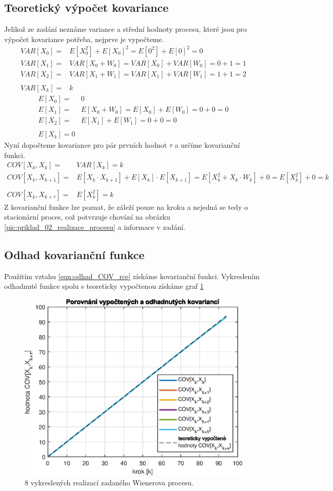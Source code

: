 \documentclass{article}
\begin{document}
		\subsection{Teoretický výpočet kovariance}
			Jelikož ze zadání neznáme variance a střední hodnoty procesu, které jsou pro výpočet kovariance potřeba, nejprve je vypočteme.
			\begin{align}
				VAR[X_{0}] =& E[X_{0}^{2}]+E[X_{0}]^{2} = E[0^{2}]+ E[0]^{2}=0\\
				VAR[X_{1}] =& VAR[X_{0}+W_{0}] = VAR[X_{0}]+ VAR[W_{0}] = 0 + 1 = 1\\
				VAR[X_{2}] =& VAR[X_{1}+W_{1}] = VAR[X_{1}]+ VAR[W_{1}] = 1 + 1 = 2\\
				\\
				VAR[X_{k}] =& k
			\end{align}
			\begin{align}
				E[X_{0}] =& 0\\
				E[X_{1}] =& E[X_{0}+W_{0}] = E[X_{0}] + E[W_{0}] = 0+0=0\\
				E[X_{2}] =& E[X_{1}] + E[W_{1}] = 0+0=0\\
				\\
				E[X_{k}] = 0
			\end{align}
			Nyní dopočteme kovariance pro pár prvních hodnot \(\tau\) a určíme kovarianční funkci.
			\begin{align}
				COV[X_{k},X_{k}] =& VAR[X_{k}] = k\\
				COV[X_{k},X_{k+1}] =& E[X_{k}\cdot X_{k+1}] + E[X_{k}]\cdot E[X_{k+1}] = E[X_{k}^{2}+X_{k}\cdot W_{k}]+0 = E[X_{k}^{2}]+0=k\\
				\\
				COV[X_{k},X_{k+\tau}] =& E[X_{k}^{2}] = k
			\end{align}
			Z kovarianční funkce lze poznat, že záleží pouze na kroku a nejedná se tedy o stacionární proces, což potvrzuje chování na obrázku \ref{pic:priklad_02_realizace_procesu} a informace v zadání.
		\subsection{Odhad kovarianční funkce}
			Použitím vztahu \ref{eqn:odhad_COV_rce} získáme kovarianční funkci. Vykreslením odhadnuté funkce spolu s teoreticky vypočtenou získáme graf \ref{pic:priklad_02_porovnani_kovarianci}
			\begin{figure}[H]
				\centering
				\includegraphics[width=.5\textwidth]{./Graphics/priklad_02_porovnani_kovarianci}
				\caption{8 vykreslených realizací zadaného Wienerova procesu.}
				\label{pic:priklad_02_porovnani_kovarianci}
			\end{figure}
	\newpage	
\end{document}
